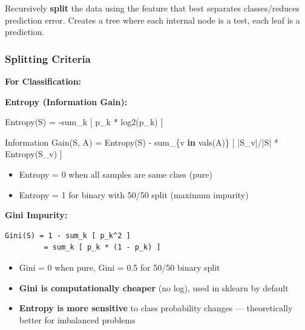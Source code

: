 \documentclass[11pt]{article}
\providecommand{\tightlist}{\setlength{\itemsep}{1pt}\setlength{\parskip}{0pt}}
\newenvironment{Shaded}{\begin{snugshade}}{\end{snugshade}}
\newcommand{\KeywordTok}[1]{\textcolor[rgb]{0.81,0.81,0.76}{\textbf{#1}}}
\newcommand{\NormalTok}[1]{\textcolor[rgb]{0.81,0.81,0.76}{#1}}
\newcommand{\OperatorTok}[1]{\textcolor[rgb]{0.81,0.81,0.76}{#1}}
\begin{document}
Recursively \textbf{split} the data using the feature that best separates classes/reduces prediction error. Creates a tree where each internal node is a test, each leaf is a prediction.

\subsubsection{Splitting Criteria}\label{splitting-criteria}

\textbf{For Classification:}

\textbf{Entropy (Information Gain):}


\begin{Shaded}
\begin{Highlighting}[]
\NormalTok{Entropy(S) }\OperatorTok{=} \OperatorTok{{-}}\NormalTok{sum\_k [ p\_k }\OperatorTok{*}\NormalTok{ log2(p\_k) ]}

\NormalTok{Information Gain(S, A) }\OperatorTok{=}\NormalTok{ Entropy(S) }\OperatorTok{{-}}\NormalTok{ sum\_\{v }\KeywordTok{in}\NormalTok{ vals(A)\} [ }\OperatorTok{|}\NormalTok{S\_v}\OperatorTok{|/|}\NormalTok{S}\OperatorTok{|} \OperatorTok{*}\NormalTok{ Entropy(S\_v) ]}
\end{Highlighting}
\end{Shaded}

\begin{itemize}
\tightlist
\item
  Entropy = 0 when all samples are same class (pure)
\item
  Entropy = 1 for binary with 50/50 split (maximum impurity)
\end{itemize}

\textbf{Gini Impurity:}

\setcodelang{}

\begin{verbatim}
Gini(S) = 1 - sum_k [ p_k^2 ]
         = sum_k [ p_k * (1 - p_k) ]
\end{verbatim}

\begin{itemize}
\tightlist
\item
  Gini = 0 when pure, Gini = 0.5 for 50/50 binary split
\item
  \textbf{Gini is computationally cheaper} (no log), used in sklearn by default
\item
  \textbf{Entropy is more sensitive} to class probability changes --- theoretically better for imbalanced problems
\end{itemize}
\end{document}
